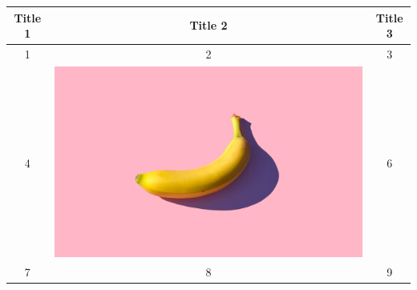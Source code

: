 \documentclass{article}
\begin{document}
\begin{tabular}{|c|c|c|}
\hline
Title 1 & Title 2 & Title 3 \\ \hline
1 & 2 & 3 \\ \hline
4 & \includegraphics{img} & 6 \\ \hline
7 & 8 & 9 \\ \hline
\end{tabular}
\end{document}
